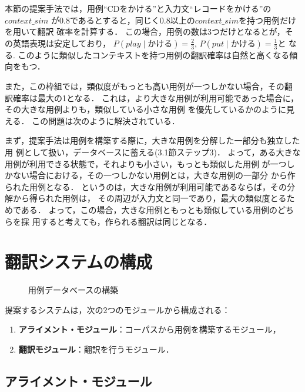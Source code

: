 本節の提案手法では，用例``CDをかける''と入力文``レコードをかける''の$context\_sim$
が0.8であるとすると，同じく0.8以上の$context\_sim$を持つ用例だけを用いて翻訳
確率を計算する．
この場合，用例の数は3つだけとなるとが，その英語表現は安定しており，
$P(play \mid かける)=\frac{2}{3}$,  $P(put \mid かける)=\frac{1}{3}$と
なる.
このように類似したコンテキストを持つ用例の翻訳確率は自然と高くなる傾向をもつ．


また，この枠組では，類似度がもっとも高い用例が一つしかない場合，その翻
訳確率は最大の1となる．
これは，より大きな用例が利用可能であった場合に，その大きな用例よりも，類似している小さな用例
を優先しているかのように見える．
この問題は次のように解決されている．

まず，提案手法は用例を構築する際に，大きな用例を分解した一部分も独立した用
例として扱い，データベースに蓄える(3.1節ステップ3)．
よって，ある大きな用例が利用できる状態で，それよりも小さい，もっとも類似した用例
が一つしかない場合における，その一つしかない用例とは，大きな用例の一部分
から作られた用例となる．
というのは，大きな用例が利用可能であるならば，その分解から得られた用例は，
その周辺が入力文と同一であり，最大の類似度とるためである．
よって，この場合，大きな用例ともっとも類似している用例のどちらを採
用すると考えても，作られる翻訳は同じとなる．


\section{翻訳システムの構成}

\begin{figure*}
\begin{center}
\epsfxsize=100mm
\end{center}
\caption{用例データベースの構築}
\label{f_te_c6_te.eps}
\end{figure*}

提案するシステムは，次の2つのモジュールから構成される：

\begin{enumerate}
\item \textbf{アライメント・モジュール}：コーパスから用例を構築するモジュール，
\item \textbf{翻訳モジュール}：翻訳を行うモジュール．
\end{enumerate}

\subsection{アライメント・モジュール}

